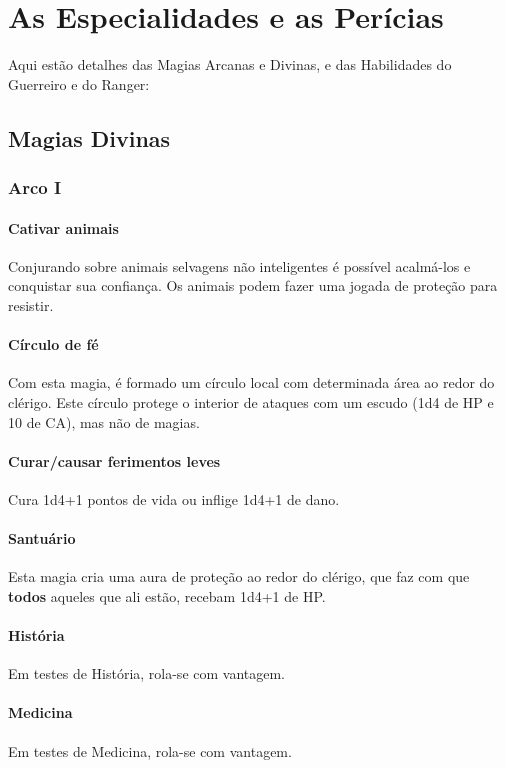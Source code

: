 \documentclass[10pt,twoside,twocolumn]{book}
\begin{document}
\chapter{As Especialidades e as Perícias}

Aqui estão detalhes das Magias Arcanas e Divinas, e das Habilidades do Guerreiro e do Ranger:

\section{Magias Divinas}

\subsection*{Arco I}
\subsubsection*{Cativar animais}
Conjurando sobre animais selvagens não inteligentes é possível acalmá-los e conquistar sua confiança. Os animais podem fazer uma jogada de proteção para resistir.
\subsubsection*{Círculo de fé}
Com esta magia, é formado um círculo local com determinada área ao redor do clérigo. Este círculo protege o interior de ataques com um escudo (1d4 de HP e 10 de CA), mas não de magias. 
\subsubsection*{Curar/causar ferimentos leves}
Cura 1d4+1 pontos de vida ou inflige 1d4+1 de dano.
\subsubsection*{Santuário}
Esta magia cria uma aura de proteção ao redor do clérigo, que faz com que \textbf{todos} aqueles que ali estão, recebam 1d4+1 de HP. 
\subsubsection*{História}
Em testes de História, rola-se com vantagem.
\subsubsection*{Medicina}
Em testes de Medicina, rola-se com vantagem.
\end{document}
